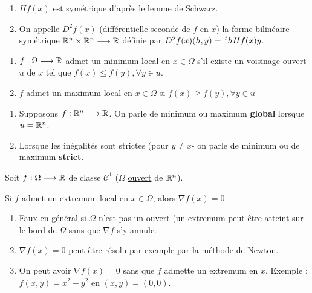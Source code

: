 \begin{remark}
    \begin{enumerate}[label=-]
        \item $Hf(x)$ est symétrique d'après le lemme de Schwarz.
        \item On appelle $D^2f(x)$ (différentielle seconde de $f$ en $x$) la forme
            bilinéaire symétrique $\mathbb{R}^n \times \mathbb{R}^n \longrightarrow \mathbb{R}$ définie par
            $D^2f(x) (h,y) = \,^th Hf(x) y$.
    \end{enumerate}
\end{remark}

\begin{fdef}
    \begin{enumerate}[label=-]
        \item $f : \Omega \longrightarrow \mathbb{R}$ admet un minimum local en $x \in \Omega$ s'il existe
            un voisinage ouvert $u$ de $x$ tel que $f(x) \leq f(y), \forall y \in u$.

        \item $f$ admet un maximum local en $x \in \Omega$ si $f(x) \geq f(y), \forall y \in u$
    \end{enumerate}
\end{fdef}

\begin{remark}
    \begin{enumerate}[label=•]
        \item Supposons $f : \mathbb{R}^n \longrightarrow \mathbb{R}$. On parle de minimum ou maximum
            \textbf{global} lorsque $u = \mathbb{R}^n$.

        \item Lorsque les inégalités sont strictes (pour $y \ne x$- on parle de minimum
            ou de maximum \textbf{strict}.
    \end{enumerate}
\end{remark}

\begin{lemme}
    Soit $f : \Omega \longrightarrow \mathbb{R}$ de classe $\mathcal{C}^1$ ($\Omega$ \underline{ouvert} de $\mathbb{R}^n$). 
    
    Si $f$ admet un extremum local en $x \in \Omega$, alors $\nabla f(x) = 0$.
\end{lemme}

\begin{remark}
    \begin{enumerate}[label=-]
        \item Faux en général si $\Omega$ n'est pas un ouvert (un extremum peut être atteint
            sur le bord de $\Omega$ sans que $\nabla f$ s'y annule.

        \item $\nabla f(x) = 0$ peut être résolu par exemple par la méthode de Newton.

        \item On peut avoir $\nabla f(x) = 0$ sans que $f$ admette un extremum en $x$.
            Exemple : $f(x,y) = x^2 - y^2$ en $(x,y)= (0,0)$.
    \end{enumerate}
\end{remark}

